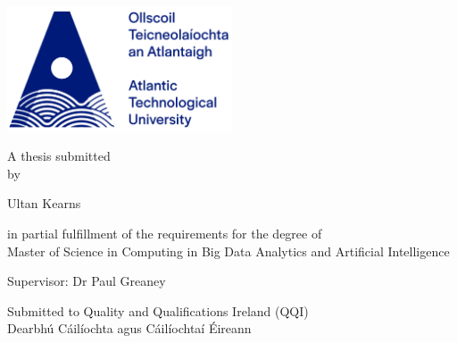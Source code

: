 \documentclass[a4paper,11pt]{report}
\begin{document}
\begin{titlepage}
    \begin{center}

    \vspace{30pt}
    \includegraphics[width=0.5\textwidth]{figures/ATULogo.png}\\
    \vspace{50pt}
    
    \fontsize{14}{20} \selectfont
    \vspace{20pt}
    
    A thesis submitted \\
    by\\
    \vspace{10pt}
    
    {\huge Ultan Kearns}\\
    \vspace{10pt}
    
     in partial fulfillment of the requirements for the degree of\\ Master of Science in Computing in Big Data Analytics and Artificial Intelligence
    \vspace{20pt}

    
    
    Supervisor: Dr Paul Greaney
    \vspace{30pt}
    
    
Submitted to Quality and Qualifications Ireland (QQI) \\
Dearbhú Cáilíochta agus Cáilíochtaí Éireann
    \centerline{\monthname \quad \the\year}
\end{center}    
\end{titlepage}

\onehalfspace


\setcounter{page}{1}

\setcounter{tocdepth}{2}

\tableofcontents
{}
\end{document}
